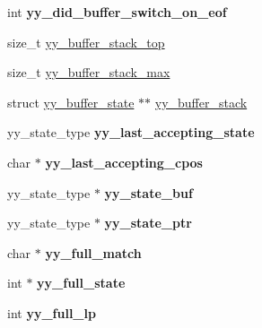 \begin{DoxyCompactItemize}
\item 
int {\bfseries yy\+\_\+did\+\_\+buffer\+\_\+switch\+\_\+on\+\_\+eof}\hypertarget{classyyFlexLexer_afdb4b21e0d512793a74d2eff444bffa9}{}\label{classyyFlexLexer_afdb4b21e0d512793a74d2eff444bffa9}

\item 
size\+\_\+t \hyperlink{classyyFlexLexer_ad30ce09b0f06b749463bb1ddc8f74877}{yy\+\_\+buffer\+\_\+stack\+\_\+top}
\item 
size\+\_\+t \hyperlink{classyyFlexLexer_ad94e6d3987eb9dad09041a5cb006da7b}{yy\+\_\+buffer\+\_\+stack\+\_\+max}
\item 
struct \hyperlink{structyy__buffer__state}{yy\+\_\+buffer\+\_\+state} $\ast$$\ast$ \hyperlink{classyyFlexLexer_ae4914f003bda6f0dfc20e30703673bea}{yy\+\_\+buffer\+\_\+stack}
\item 
yy\+\_\+state\+\_\+type {\bfseries yy\+\_\+last\+\_\+accepting\+\_\+state}\hypertarget{classyyFlexLexer_a7f55fb6c3dadf359d4085ecb88a39bc3}{}\label{classyyFlexLexer_a7f55fb6c3dadf359d4085ecb88a39bc3}

\item 
char $\ast$ {\bfseries yy\+\_\+last\+\_\+accepting\+\_\+cpos}\hypertarget{classyyFlexLexer_a488e654c851a95f0e18e00278d0f6f0b}{}\label{classyyFlexLexer_a488e654c851a95f0e18e00278d0f6f0b}

\item 
yy\+\_\+state\+\_\+type $\ast$ {\bfseries yy\+\_\+state\+\_\+buf}\hypertarget{classyyFlexLexer_aae59bd9cba37e88415d23335ba325c70}{}\label{classyyFlexLexer_aae59bd9cba37e88415d23335ba325c70}

\item 
yy\+\_\+state\+\_\+type $\ast$ {\bfseries yy\+\_\+state\+\_\+ptr}\hypertarget{classyyFlexLexer_a7070807bda77c514273574e1a7e371d4}{}\label{classyyFlexLexer_a7070807bda77c514273574e1a7e371d4}

\item 
char $\ast$ {\bfseries yy\+\_\+full\+\_\+match}\hypertarget{classyyFlexLexer_a2c7312ae0d1942c35c4d9a807a498d5a}{}\label{classyyFlexLexer_a2c7312ae0d1942c35c4d9a807a498d5a}

\item 
int $\ast$ {\bfseries yy\+\_\+full\+\_\+state}\hypertarget{classyyFlexLexer_aa58660405fbe6d717216f23d32adbd20}{}\label{classyyFlexLexer_aa58660405fbe6d717216f23d32adbd20}

\item 
int {\bfseries yy\+\_\+full\+\_\+lp}\hypertarget{classyyFlexLexer_a098331aae82780c3eb3ad9f63795f426}{}\label{classyyFlexLexer_a098331aae82780c3eb3ad9f63795f426}


\end{DoxyCompactItemize}
